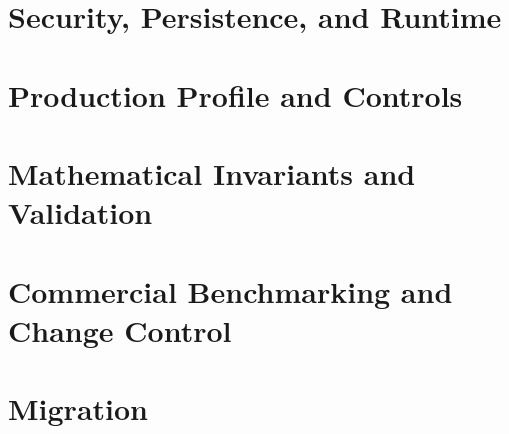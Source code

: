 \documentclass[11pt]{report}
\begin{document}


\part{Security, Persistence, and Runtime}




\part{Production Profile and Controls}




\part{Mathematical Invariants and Validation}




\part{Commercial Benchmarking and Change Control}






\part{Migration}



\appendix








\end{document}
